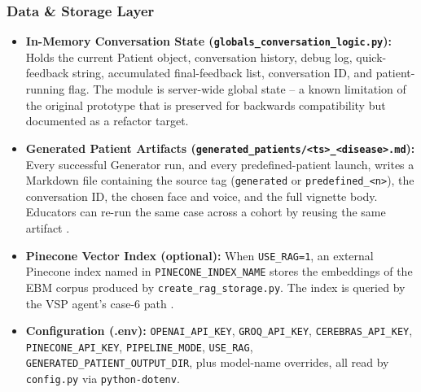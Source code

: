 \documentclass{article}
\begin{document}
\subsubsection{Data \& Storage Layer}
\begin{itemize}
    \item \textbf{In-Memory Conversation State (\texttt{globals\_conversation\_logic.py}):}
    Holds the current Patient object, conversation history, debug log, quick-feedback string, accumulated final-feedback list, conversation ID, and patient-running flag. The module is server-wide global state -- a known limitation of the original prototype that is preserved for backwards compatibility but documented as a refactor target.

    \item \textbf{Generated Patient Artifacts (\texttt{generated\_patients/<ts>\_<disease>.md}):}
    Every successful Generator run, and every predefined-patient launch, writes a Markdown file containing the source tag (\texttt{generated} or \texttt{predefined\_<n>}), the conversation ID, the chosen face and voice, and the full vignette body. Educators can re-run the same case across a cohort by reusing the same artifact \cite{Mahajan2022TextualDQ}.

    \item \textbf{Pinecone Vector Index (optional):}
    When \texttt{USE\_RAG=1}, an external Pinecone index named in \texttt{PINECONE\_INDEX\_NAME} stores the embeddings of the EBM corpus produced by \texttt{create\_rag\_storage.py}. The index is queried by the VSP agent's case-6 path \cite{Monir2024VectorSearchED}.

    \item \textbf{Configuration (.env):}
    \texttt{OPENAI\_API\_KEY}, \texttt{GROQ\_API\_KEY}, \texttt{CEREBRAS\_API\_KEY}, \texttt{PINECONE\_API\_KEY}, \texttt{PIPELINE\_MODE}, \texttt{USE\_RAG}, \texttt{GENERATED\_PATIENT\_OUTPUT\_DIR}, plus model-name overrides, all read by \texttt{config.py} via \texttt{python-dotenv}.
\end{itemize}
\end{document}
